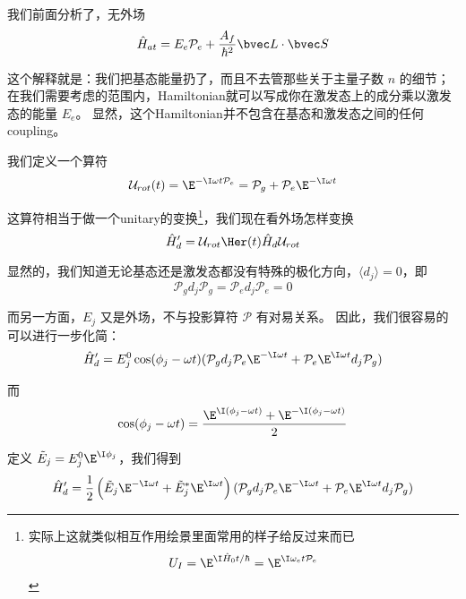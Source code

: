 我们前面分析了，无外场
\begin{equation}
\hat{H}_{at} = E_e\mathcal{P}_e + \frac{A_{f}}{\hbar^2}\bvec L\cdot \bvec S
\end{equation}

这个解释就是：我们把基态能量扔了，而且不去管那些关于主量子数 $n$ 的细节；在我们需要考虑的范围内，Hamiltonian就可以写成你在激发态上的成分乘以激发态的能量 $E_e$。 显然，这个Hamiltonian并不包含在基态和激发态之间的任何coupling。

我们定义一个算符
\begin{equation}
\mathcal{U}_{rot}(t) = \E^{-\I\omega t\mathcal{P}_e} = \mathcal{P}_g + \mathcal{P}_e \E^{-\I\omega t}
\end{equation}

这算符相当于做一个unitary的变换\footnote{实际上这就类似相互作用绘景里面常用的样子给反过来而已
\begin{equation}
U_I = \E^{\I\hat{H}_0t/\hbar} = \E^{\I\omega_e t\mathcal{P}_e}
\end{equation}
}，我们现在看外场怎样变换
\begin{equation}
\hat{H}_d' = \mathcal{U}_{rot}\Her(t)\hat{H}_d \mathcal{U}_{rot}
\end{equation}

显然的，我们知道无论基态还是激发态都没有特殊的极化方向，$\langle d_j \rangle = 0$，即
\begin{equation}
\mathcal{P}_g d_j \mathcal{P}_g = \mathcal{P}_e d_j \mathcal{P}_e = 0
\end{equation}

而另一方面，$E_j$ 又是外场，不与投影算符 $\mathcal{P}$ 有对易关系。 因此，我们很容易的可以进行一步化简：
\begin{equation}
\hat{H}_d' = E_j^0\cos(\phi_j-\omega t) (\mathcal{P}_g d_j \mathcal{P}_e \E^{-\I\omega t} + \mathcal{P}_e \E^{\I\omega t} d_j \mathcal{P}_g)
\end{equation}

而
\begin{equation}
\cos(\phi_j - \omega t) = \frac{\E^{\I(\phi_j-\omega t)} + \E^{-\I(\phi_j-\omega t)}}{2}
\end{equation}

定义 $\tilde{E}_j = E_j^0 \E^{\I\phi_j}$，我们得到
\begin{equation}
\hat{H}_d' = \frac{1}{2}\left(\tilde{E}_j \E^{-\I\omega t} + \tilde{E}_j^* \E^{\I\omega t}\right) (\mathcal{P}_g d_j \mathcal{P}_e \E^{-\I\omega t} + \mathcal{P}_e \E^{\I\omega t} d_j \mathcal{P}_g)
\end{equation}

